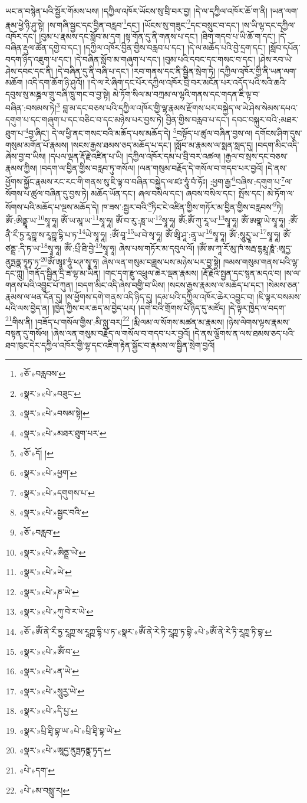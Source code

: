 ཡང་ན་བསྙེན་པའི་སྦྱོར་གོམས་པས། །དཀྱིལ་འཁོར་ཡོངས་སུ་བྲི་བར་བྱ། །དེ་ལ་དཀྱིལ་འཁོར་ཆོ་ག་ནི། །ཡན་ལག་རྣམ་ཕྱེ་ཉི་ཤུ་སྟེ། །ས་གཞི་སྦྱང་དང་བྱིན་བརླབ་\footnote{«ཅོ་»བརླབས་}དང་། །ཡོངས་སུ་གཟུང་\footnote{«སྣར་»«པེ་»བཟུང་}དང་བསྲུང་བ་དང་། །ས་ཡི་ལྷ་དང་དཀྱིལ་འཁོར་དང་། །བུམ་པ་རྣམས་དང་སློབ་མ་དག །སྟ་གོན་དུ་ནི་གནས་པ་དང་། །ཐིག་གདབ་པ་ཡི་ཆོ་ག་དང་། །དེ་བཞིན་རྡུལ་ཚོན་དགྱེ་བ་དང་། །དཀྱིལ་འཁོར་བྱིན་གྱིས་བརླབ་པ་དང་། །དེ་ལ་མཆོད་པའི་བྱེ་དྲག་དང་། །སློབ་དཔོན་བདག་ཉིད་འཇུག་པ་དང་། །དེ་བཞིན་སློབ་མ་གཞུག་པ་དང་། །བུམ་པའི་དབང་དང་གསང་བ་དང་། །ཤེས་རབ་ཡེ་ཤེས་དབང་དང་ནི། །དེ་བཞིན་དུ་ནི་བཞི་པ་དང་། །རབ་གནས་དང་ནི་སྦྱིན་སྲེག་ཏེ། །དཀྱིལ་འཁོར་གྱི་ནི་ཡན་ལག་མཆོག །འདི་དག་ཆོག་ཉི་ཤུའོ།། །།དེ་ལ་རེ་ཞིག་དང་པོར་དཀྱིལ་འཁོར་བྲི་བར་མངོན་པར་འདོད་པའི་སའི་ཆའི་དབུས་སུ་མཎྜལ་གྲུ་བཞི་ཁྲུ་གང་བ་བྱ་སྟེ། མེ་ཏོག་སིལ་མ་བཀྲམ་ལ་ལྷའི་གནས་དང་གདན་ཇི་ལྟ་བ་བཞིན་:བསམས་ཏེ།\footnote{«སྣར་»«པེ་»བསམ་སྟེ།} བླ་མ་དང་བཅས་པའི་དཀྱིལ་འཁོར་གྱི་ལྷ་རྣམས་རྫོགས་པར་བསྐྱེད་ལ་ཡེ་ཤེས་སེམས་དཔའ་དགུག་པ་དང་གཞུག་པ་དང་བཅིང་བ་དང་མཉེས་པར་བྱས་ཏེ། བྱིན་གྱིས་བརླབ་པ་དང་། དབང་བསྐུར་བའི་:མཐར་ཐུག་པ་\footnote{«སྣར་»«པེ་»མཐར་ཐུག་པར་}བྱ་ཞིང་། དེ་ལ་ཕྱི་ནང་གསང་བའི་མཆོད་པས་མཆོད་དེ། \footnote{«ཅོ་»དོ། ། }བསྟོད་པ་ཚུལ་བཞིན་བྱས་ལ། དགོངས་ཤིག་དུས་གསུམ་མགོན་པོ་རྣམས། །སངས་རྒྱས་ཐམས་ཅད་མཆོད་པ་དང་། །སློབ་མ་རྣམས་ལ་སྨན་སླད་དུ། །བདག་མིང་འདི་ཞེས་བྱ་བ་ཡིས། །དཔལ་ལྡན་རྡོ་རྗེ་འཛིན་པ་ཡི། །དཀྱིལ་འཁོར་དམ་པ་བྲི་བར་འཚལ། །རྒྱལ་བ་སྲས་དང་བཅས་རྣམས་ཀྱིས། །བདག་ལ་བྱིན་གྱིས་བརླབ་ཏུ་གསོལ། །ལན་གསུམ་བརྗོད་དེ་གསོལ་བ་གདབ་པར་བྱའོ། །དེ་ནས་ཕྱོགས་སྐྱོང་རྣམས་རང་རང་གི་གནས་སུ་ཇི་ལྟ་བ་བཞིན་བསྐྱེད་ལ་ཛཿ་ཧཱུཾ་བཾ་ཧོཿ། :ཕྱག་རྒྱ་\footnote{«སྣར་»«པེ་»ཕྱག་}བཞིས་:དགུག་པ་\footnote{«སྣར་»«པེ་»དགུགས་པ་}ལ་སོགས་པ་ཚུལ་བཞིན་དུ་བྱས་ཏེ། མཆོད་ཡོན་དང་། ཞལ་བསིལ་དང་། ཞབས་བསིལ་དང་། སྤོས་དང་། མེ་ཏོག་ལ་སོགས་པའི་མཆོད་པ་ལྔས་མཆོད་དེ། ཁ་ཟས་:སྦྱར་བའི་\footnote{«སྣར་»«པེ་»སྦྱང་བའི་}ཏིང་ངེ་འཛིན་གྱིས་གཏོར་མ་བྱིན་གྱིས་བརླབས་\footnote{«ཅོ་»བརླབ་}ཏེ། ཨོཾ་:ཨིནྡྲཱ་ཡ་\footnote{«སྣར་»«པེ་»ཨིནྡྲ་ཡེ་}སྭཱ་ཧཱ། ཨོཾ་ཡ་མཱ་ཡ་\footnote{«སྣར་»«པེ་»ཡེ་}སྭཱ་ཧཱ། ཨོཾ་བ་རུ་:ཎཱ་ཡ་\footnote{«སྣར་»«པེ་»ཎ་ཡེ་}སྭཱ་ཧཱ། ཨོཾ:ཨོཾ་ཀུ་རཱ་ཡ་\footnote{«སྣར་»«པེ་»ཀུ་བེ་ར་ཡེ་}སྭཱ་ཧཱ། ཨོཾ་ཨགྣ་ཡེ་སྭཱ་ཧཱ། :ཨོཾ་ནཻ་རྀ་ཏྱ་རཱཀྵཱ་ས་རཱཀྵཱ་དྷི་པ་ཏ་\footnote{«ཅོ་»ཨོཾ་ནེ་རྀ་ཏྱ་རཱཀྵ་ས་རཱཀྵ་དྷི་པ་ཏ་«སྣར་»ཨོཾ་ནེ་རེ་ཏི་རཱཀྵ་ཏ་བྷི་«པེ་»ཨོཾ་ནེ་རེ་ཏི་རཱཀྵ་ཏི་བྷ་}ཡེ་སྭཱ་ཧཱ། :ཨོཾ་བཱ་\footnote{«སྣར་»«པེ་»ཨོཾ་བ་}ཡ་བེ་སྭ་ཧཱ། ཨོཾ་ཨཱི་ཤཱ་:ནཱ་ཡ་\footnote{«སྣར་»«པེ་»ན་ཡེ་}སྭཱ་ཧཱ། ཨོཾ་:སཱུརྱཱ་ཡ་\footnote{«སྣར་»«པེ་»སཱུརྱ་ཡེ་}སྭཱ་ཧཱ། ཨོཾ་ཙནྡྲ་:དི་ཏ་ཡ་\footnote{«སྣར་»«པེ་»དི་པྱ་}སྭཱ་ཧཱ། ཨོཾ་:པྲྀ་ཐི་བྱེ་\footnote{«སྣར་»པྲི་ཐྭི་བྷ་ཡ་«པེ་»པྲི་ཐྭི་བྷ་ཡེ་}སྭཱ་ཧཱ། ཞེས་པས་གཏོར་མ་དབུལ་ལོ། །ཨོཾ་ཨ་ཀཱ་རོ་མུ་ཁཾ་སརྦ་དྷརྨཱ་ཎཱཾ་:ཨཱདྱ་ནུཏྤནྣ་ཏྭཱཏྭ་ཏ་\footnote{«སྣར་»«པེ་»ཨཱདྱ་ནུཏྤཏནྣ་ཏྭད་}ཨོཾ་ཨཱཿ་ཧཱུཾ་ཕཊ་སྭཱ་ཧཱ། ཞེས་ལན་གསུམ་བཟླས་པས་མཉེས་པར་བྱ་སྟེ། ཁམས་གསུམ་གནས་པའི་ལྷ་དང་ཀླུ། །གནོད་སྦྱིན་དྲི་ཟ་ལྷ་མ་ཡིན། །གང་དག་རྫུ་འཕྲུལ་ཆེར་ལྡན་རྣམས། །རྡོ་རྗེའི་སྤྱན་དང་སྙན་མདའ་བ། །ས་ལ་གནས་པའི་འབྱུང་པོ་ཀུན། །བདག་མིང་འདི་ཞེས་བགྱི་བ་ཡིས། །སངས་རྒྱས་རྣམས་ལ་མཆོད་པ་དང་། །སེམས་ཅན་རྣམས་ལ་ཕན་དོན་དུ། །ས་ཕྱོགས་དགེ་གནས་འདི་ཉིད་དུ། །དམ་པའི་དཀྱིལ་འཁོར་ཆེར་འབྱུང་བ། །ཇི་ལྟར་བསམས་པའི་ལས་བྱེད་ན། །ཁྱེད་ཀྱིས་བར་ཆད་མ་བྱེད་པར། །དགེ་བའི་གྲོགས་པོ་ཉིད་དུ་མཛོད། །དེ་ལྟར་ཁྱེད་ལ་བདག་\footnote{«པེ་»དག་}གིས་ནི། །བཟོད་པ་གསོལ་གྱིས་:མི་སླུ་བར།\footnote{«པེ་»མ་བསླུ་ར།} །རྨི་ལམ་ལ་སོགས་མཚན་མ་རྣམས། །ཉེས་ལེགས་ལྟས་རྣམས་བསྟན་དུ་གསོལ། །ཞེས་ལན་གསུམ་བརྗོད་ལ་གསོལ་བ་གདབ་པར་བྱའོ། །དེ་ནས་ལྕོགས་ན་ལས་ཐམས་ཅད་པའི་ཐབ་ཁུང་དེར་དཀྱིལ་འཁོར་གྱི་ལྷ་དང་འཇིག་རྟེན་སྐྱོང་བ་རྣམས་ལ་སྦྱིན་སྲེག་བྱའོ། 